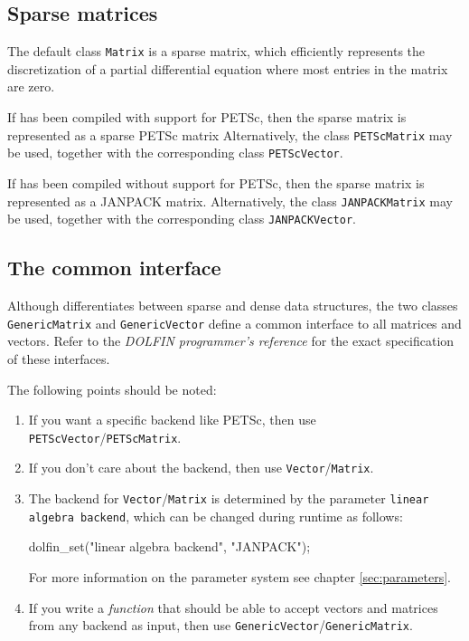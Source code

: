 \subsection{Sparse matrices}

The default \dolfin{} class \texttt{Matrix} is a sparse matrix, which
efficiently represents the discretization of a partial differential
equation where most entries in the matrix are zero. 

If \dolfin{} has been compiled with support for PETSc, then the sparse
matrix is represented as a sparse PETSc matrix Alternatively, the
class \texttt{PETScMatrix} may be used, together with the
corresponding class \texttt{PETScVector}.

If \dolfin{} has been compiled without support for PETSc, then the
sparse matrix is represented as a JANPACK matrix. Alternatively,
the class \texttt{JANPACKMatrix} may be used, together with the
corresponding class \texttt{JANPACKVector}.

\subsection{The common interface}

Although \dolfin{} differentiates between sparse and dense data
structures, the two classes \texttt{GenericMatrix} and
\texttt{GenericVector} define a common interface to all matrices and
vectors. Refer to the \emph{DOLFIN programmer's reference} for the
exact specification of these interfaces.

The following points should be noted:
\begin{enumerate}
\item
  If you want a specific backend like PETSc, then use
  \texttt{PETScVector}/\texttt{PETScMatrix}.
\item
  If you don't care about the backend, then use \texttt{Vector}/\texttt{Matrix}.
\item
  The backend for \texttt{Vector}/\texttt{Matrix} is determined by the
  parameter \texttt{linear algebra backend}, which can be changed
  during runtime as follows:
\begin{code}
dolfin_set("linear algebra backend", "JANPACK");
\end{code}
For more information on the parameter system see chapter \ref{sec:parameters}.
\item
  If you write a \emph{function} that should be able to accept vectors
  and matrices from any backend as input, then use
  \texttt{GenericVector}/\texttt{GenericMatrix}.
\end{enumerate}


